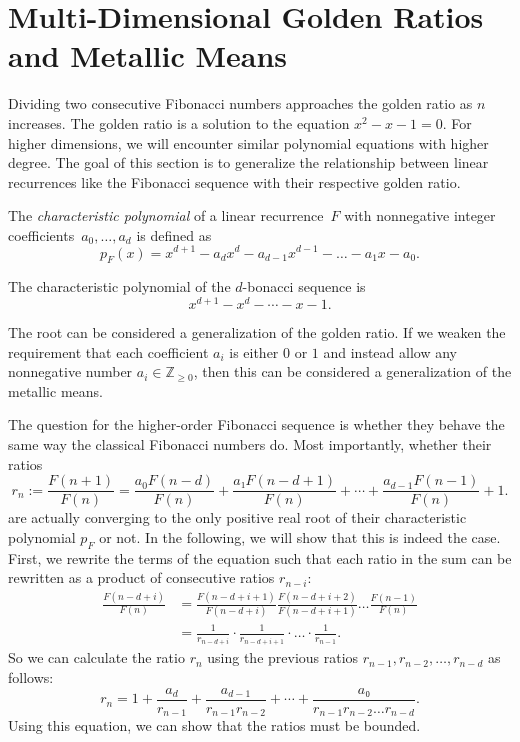 \section{Multi-Dimensional Golden Ratios and Metallic Means}

Dividing two consecutive Fibonacci numbers approaches the golden ratio as $n$ increases.
The golden ratio is a solution to the equation $x^2 - x - 1 = 0$.
For higher dimensions, we will encounter similar polynomial equations with higher degree.
The goal of this section is to generalize the relationship between linear
recurrences like the Fibonacci sequence with their respective golden ratio.

\begin{definition}
  The \emph{characteristic polynomial} of a linear recurrence~$F$ with
  nonnegative integer coefficients~$a_0, \dots, a_d$ is defined as
  \[
    p_F(x) = x^{d+1} - a_d x^d - a_{d-1} x^{d-1} - \dots - a_1 x - a_0.
  \]
\end{definition}


\begin{example}
  The characteristic polynomial of the $d$-bonacci sequence is
  \[
    x^{d+1} - x^d - ⋯ - x - 1.
  \]
\end{example}

The root can be considered a generalization of the golden ratio.
If we weaken the requirement that each coefficient $a_i$ is either $0$ or $1$ and
instead allow any nonnegative number $a_i ∈ ℤ_{≥ 0}$, then this can be considered a
generalization of the metallic means.

The question for the higher-order Fibonacci sequence is whether they behave the
same way the classical Fibonacci numbers do.
Most importantly, whether their ratios
\[
  r_n
  := \frac{F(n+1)}{F(n)}
  = \frac{a_0 F(n - d)}{F(n)} + \frac{a₁ F(n - d + 1)}{F(n)} + ⋯ + \frac{a_{d-1} F(n-1)}{F(n)} + 1.
\]
are actually converging to the only positive real root of their characteristic
polynomial $p_F$ or not.
In the following, we will show that this is indeed the case.
First, we rewrite the terms of the equation such that each ratio in the sum can
be rewritten as a product of consecutive ratios $r_{n-i}$:
\begin{align*}
  \frac{F(n - d + i)}{F(n)}
  & = \frac{F(n - d + i + 1)}{F(n - d + i)} \frac{F(n - d + i + 2)}{F(n - d + i + 1)} \dots \frac{F(n-1)}{F(n)} \\
  & = \frac{1}{r_{n - d + i}} · \frac{1}{r_{n - d + i + 1}} · \dots · \frac{1}{r_{n-1}}.
\end{align*}
So we can calculate the ratio $r_n$ using the previous ratios $r_{n-1}, r_{n-2}, …, r_{n-d}$ as follows:
\[
  r_n = 1 + \frac{a_d}{r_{n-1}} + \frac{a_{d-1}}{r_{n-1} r_{n-2}} + ⋯ + \frac{a₀}{r_{n-1} r_{n-2} \dots r_{n-d}}.
\]
Using this equation, we can show that the ratios must be bounded.

